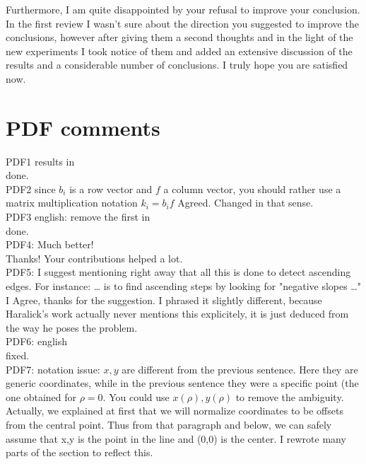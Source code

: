\documentclass[a4paper,10pt]{report}
\begin{document}
\que Furthermore, I am quite disappointed by your refusal to improve your conclusion.\\

\ans In the first review I wasn't sure about the direction you suggested to improve the conclusions, however after giving them a second thoughts and in the light of the new experiments I took notice of them and added an extensive discussion of the results and a considerable number of conclusions. I truly hope you are satisfied now.\\

\section{PDF comments}

\que PDF1 results in\\
\ans done.\\

\que PDF2  since $b_i$ is a row vector and $f$ a column vector, you should rather use a matrix multiplication notation
$k_i=b_i f$
\ans Agreed. Changed in that sense.\\

\que PDF3 english: remove the first in\\
\ans done.\\

\que PDF4: Much better!\\
\ans Thanks! Your contributions helped a lot.\\

\que PDF5: I suggest mentioning right away that all this is done to detect ascending edges. For instance: … is to find ascending steps by looking for "negative slopes …"\\
\ans I Agree, thanks for the suggestion. I phrased it slightly different, because Haralick's work actually never mentions this explicitely, it is just deduced from the way he poses the problem.\\

\que PDF6: english\\
\ans fixed.\\

\que PDF7: notation issue: $x,y$ are different from the previous sentence. Here they are generic coordinates, while in the previous sentence they were a specific point (the one obtained for $\rho=0$. You could use $x(\rho),y(\rho)$ to remove the ambiguity.\\
\ans Actually, we explained at first that we will normalize coordinates to be offsets from the central point. Thus from that paragraph and below, we can safely assume that x,y is the point in the line and (0,0) is the center. I rewrote many parts of the section to reflect this.\\
\end{document}
